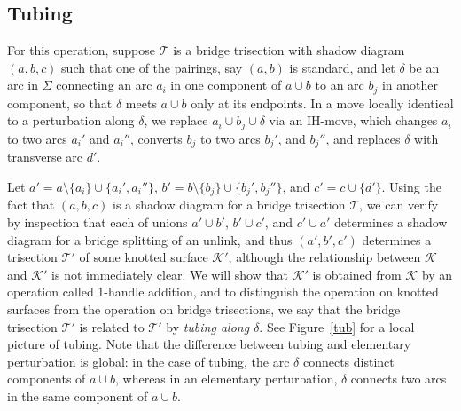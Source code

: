 \documentclass[11pt, oneside]{amsart}
\theoremstyle{theorem}
\theoremstyle{definition}
\newcommand{\K}{\mathcal{K}}
\newcommand{\T}{\mathcal{T}}
\theoremstyle{theorem}
\begin{document}
\subsection{Tubing}

For this operation, suppose $\T$ is a bridge trisection with shadow diagram $(a,b,c)$ such that one of the pairings, say $(a,b)$ is standard, and let $\delta$ be an arc in $\Sigma$ connecting an arc $a_i$ in one component of $a \cup b$ to an arc $b_j$ in another component, so that $\delta$ meets $a\cup b$ only at its endpoints.  In a move locally identical to a perturbation along $\delta$, we replace $a_i \cup b_j \cup \delta$ via an IH-move, which changes $a_i$ to two arcs $a_i'$ and $a_i''$, converts $b_j$ to two arcs $b_j'$, and $b_j''$, and replaces $\delta$ with transverse arc $d'$.

Let $a' = a \setminus \{a_i\} \cup \{a_i',a_i''\}$, $b' = b \setminus \{b_j\} \cup \{b_j',b_j''\}$, and $c' = c \cup \{d'\}$.  Using the fact that $(a,b,c)$ is a shadow diagram for a bridge trisection $\T$, we can verify by inspection that each of unions $a' \cup b'$, $b' \cup c'$, and $c' \cup a'$ determines a shadow diagram for a bridge splitting of an unlink, and thus $(a',b',c')$ determines a trisection $\T'$ of some knotted surface $\K'$, although the relationship between $\K$ and $\K'$ is not immediately clear.  We will show that $\K'$ is obtained from $\K$ by an operation called 1-handle addition, and to distinguish the operation on knotted surfaces from the operation on bridge trisections, we say that the bridge trisection $\T'$ is related to $\T'$ by \emph{tubing along $\delta$}.  See Figure~\ref{tub} for a local picture of tubing.  Note that the difference between tubing and elementary perturbation is global: in the case of tubing, the arc $\delta$ connects distinct components of $a \cup b$, whereas in an elementary perturbation, $\delta$ connects two arcs in the same component of $a \cup b$.
\end{document}
